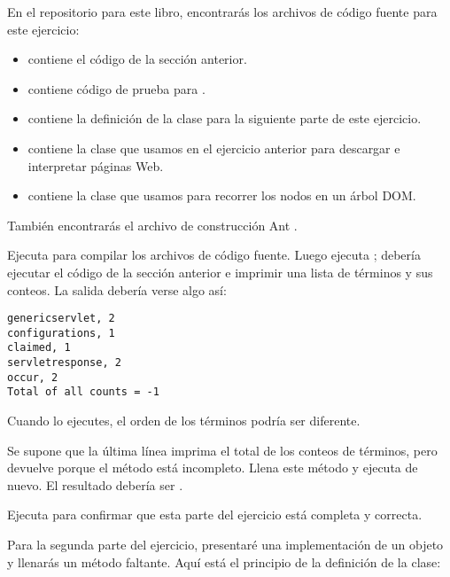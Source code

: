 \documentclass[12pt]{book}
\theoremstyle{exercise}
\begin{document}
En el repositorio para este libro,
encontrarás los archivos de código fuente para este ejercicio:

\begin{itemize}

\item {} contiene el código de la sección anterior.

\item {} contiene código de prueba para
  .

\item {} contiene la definición de la clase para la siguiente
  parte de este ejercicio.

\item {} contiene la clase que usamos en el 
  ejercicio anterior para descargar e interpretar páginas Web.

\item {} contiene la clase que usamos para recorrer
  los nodos en un árbol DOM.

\end{itemize}

También encontrarás el archivo de construcción Ant
.


Ejecuta  para compilar los archivos de código
  fuente. Luego ejecuta ; debería ejecutar el código
  de la sección anterior e imprimir una lista de términos y sus conteos. La
  salida debería verse algo así:

\begin{verbatim}
genericservlet, 2
configurations, 1
claimed, 1
servletresponse, 2
occur, 2
Total of all counts = -1
\end{verbatim}

Cuando lo ejecutes, el orden de los términos podría ser diferente.


Se supone que la última línea imprima el total de los conteos de términos, pero
devuelve  porque el método  está incompleto.
Llena este método y ejecuta  de nuevo. El resultado
debería ser .

Ejecuta  para confirmar que esta parte del
ejercicio está completa y correcta.


Para la segunda parte del ejercicio, presentaré una implementación de un
objeto  y llenarás un método faltante. Aquí está el principio
de la definición de la clase:
\end{document}

